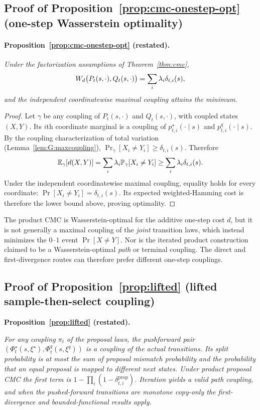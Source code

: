 \subsection{Proof of Proposition~\ref{prop:cmc-onestep-opt} (one-step Wasserstein optimality)}
\label{app:proofs:cmc-opt}

\paragraph{Proposition~\ref{prop:cmc-onestep-opt} (restated).}
\emph{Under the factorization assumptions of Theorem~\ref{thm:cmc},}
\[
W_{d}\big(P_t(s,\cdot),Q_t(s,\cdot)\big)=\sum_i\lambda_i\delta_{t,i}(s),
\]
\emph{and the independent coordinatewise maximal coupling attains the minimum.}

\begin{proof}
Let $\gamma$ be any coupling of $P_t(s,\cdot)$ and $Q_t(s,\cdot)$, with coupled states
$(X,Y)$. Its $i$th coordinate marginal is a coupling of
$p_{t,i}^\star(\cdot\mid s)$ and $p_{t,i}^q(\cdot\mid s)$. By the coupling characterization of
total variation (Lemma~\ref{lem:G:maxcoupling}),
$\Pr_\gamma[X_i\neq Y_i]\ge\delta_{t,i}(s)$. Therefore
\[
\mathbb{E}_\gamma[d(X,Y)]
=\sum_i\lambda_i\mathbb{P}_\gamma[X_i\neq Y_i]
\ge\sum_i\lambda_i\delta_{t,i}(s).
\]
Under the independent coordinatewise maximal coupling, equality holds for every coordinate:
$\Pr[X_i\neq Y_i]=\delta_{t,i}(s)$. Its expected weighted-Hamming cost is therefore the lower
bound above, proving optimality.
\end{proof}

\begin{remark}
\label{rem:G:cmcscope}
The product CMC is Wasserstein-optimal for the additive one-step cost $d$, but it is not generally
a maximal coupling of the \emph{joint} transition laws, which instead minimizes the $0$--$1$ event
$\Pr[X\neq Y]$. Nor is the iterated product construction claimed to be a Wasserstein-optimal
\emph{path} or terminal coupling. The direct and first-divergence routes can therefore prefer
different one-step couplings.
\end{remark}



\subsection{Proof of Proposition~\ref{prop:lifted} (lifted sample-then-select coupling)}
\label{app:proofs:lifted}

\noindent\textbf{Proposition~\ref{prop:lifted} (restated).}\par
\noindent \emph{For any coupling $\pi_t$ of the proposal laws, the pushforward pair
$(\Phi_t^\star(s,\xi^\star),\Phi_t^q(s,\xi^q))$ is a coupling of the actual transitions. Its
split probability is at most the sum of proposal mismatch probability and the probability that an
equal proposal is mapped to different next states. Under product proposal CMC the first term is
$1-\prod_i(1-\delta_{t,i}^{\mathrm{prop}})$. Iteration yields a valid path coupling, and when the
pushed-forward transitions are monotone copy-only the first-divergence and bounded-functional
results apply.}

